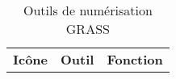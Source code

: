 \begin{table}[h]
\centering
\caption{Outils de num\'erisation GRASS}\label{tab:grass_tools}\medskip
 \begin{tabular}{|l|l|p{5in}|}
\hline \textbf{Ic\^one} & \textbf{Outil} & \textbf{Fonction} \\

\end{tabular}
\end{table}
